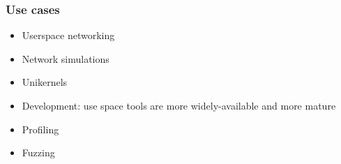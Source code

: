 

\begin{frame}

    \frametitle{Use cases}
    
        \begin{itemize}
            \item Userspace networking
            \item Network simulations
            \item Unikernels
            \item Development: use space tools are more widely-available and more mature
            \item Profiling
            \item Fuzzing
        \end{itemize}

\end{frame}